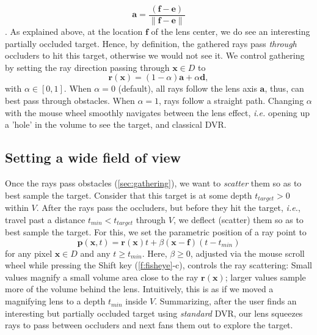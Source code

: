 \begin{equation}
 \mathbf{a} = \frac{ (\mathbf{f} - \mathbf{e}) } { \| \mathbf{f} - \mathbf{e} \| }
 \end{equation}
 . As explained above, at the location $\mathbf{f}$ of the lens center, we do see an interesting partially occluded target. Hence, by definition, the gathered rays pass \emph{through} occluders to hit this target, otherwise we would not see it. We control gathering by setting the ray direction passing through $\mathbf{x} \in D$ to
%
\begin{equation}
\mathbf{r}(\mathbf{x}) = (1-\alpha) \mathbf{a} + \alpha \mathbf{d},
\label{eqn:gathering}
\end{equation}
%
with $\alpha \in [0,1]$. When $\alpha=0$ (default), all rays follow the lens axis $\mathbf{a}$, thus, can best pass through obstacles. When $\alpha=1$, rays follow a straight path. Changing $\alpha$ with the mouse wheel smoothly navigates between the lens effect, \emph{i.e.} opening up a 'hole' in the volume to see the target, and classical DVR.
%
\subsection{Setting a wide field of view}
\label{sec:scattering}
%
Once the rays pass obstacles (\autoref{sec:gathering}), we want to \emph{scatter} them so as to best sample the target. Consider that this target is at some depth $t_{target}>0$ within $V$. After the rays pass the occluders, but before they hit the target, \emph{i.e.}, travel past a distance $t_{min} < t_{target}$ through $V$, we deflect (scatter) them so as to best sample the target. For this, we set the parametric position of a ray point to
%
\begin{equation}
\mathbf{p}(\mathbf{x}, t) = \mathbf{r}(\mathbf{x})t + \beta (\mathbf{x}-\mathbf{f})(t-t_{min})
\label{eqn:scattering}
\end{equation}
%
for any pixel $\mathbf{x} \in D$ and any $t \geq t_{min}$. Here, $\beta \geq 0$, adjusted via the mouse scroll wheel while pressing the Shift key (\autoref{f:fisheye}-c), controls the ray scattering: Small values magnify a small volume area close to the ray $\mathbf{r}(\mathbf{x})$; larger values sample more of the volume behind the lens. Intuitively, this is as if we moved a magnifying lens to a depth $t_{min}$ inside $V$. Summarizing, after the user finds an interesting but partially occluded target using \emph{standard} DVR, our lens squeezes rays to pass between occluders and next fans them out to explore the target.
%
%


